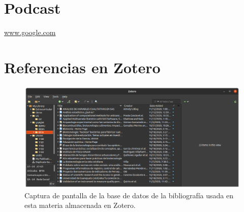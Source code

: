 \documentclass[12pt]{article}
\begin{document}
\section{Podcast}
	\url{www.google.com}

\section{Referencias en Zotero}
	\begin{figure}[h]
		\centering
		\includegraphics[width=1.1\textwidth]{zotero-final.png}
		\caption{Captura de pantalla de la base de datos de la bibliografía usada en esta materia almacenada en Zotero.}
		\label{zotero final}
	\end{figure}
\end{document}
